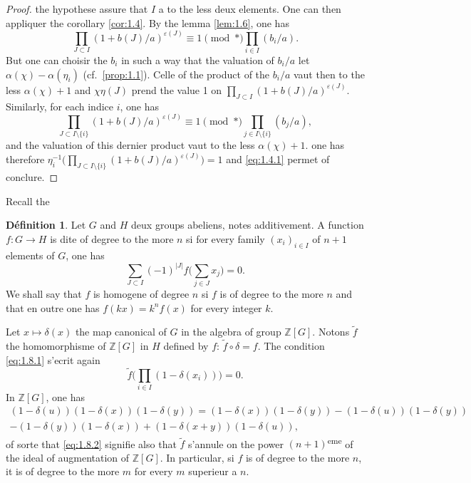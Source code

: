 \documentclass[12pt,a4paper]{article}
\theoremstyle{plain}
\theoremstyle{definition}
\newtheorem{definition}[theorem]{D\'efinition}
\theoremstyle{remark}
\newcommand{\bZ}{\mathbb{Z}}
\begin{document}
\begin{proof}
the hypothese assure that $I$ a to the less deux elements. One can then appliquer the corollary \ref{cor:1.4}. By the lemma \ref{lem:1.6}, one has
\[
\prod_{J \subset I} (1+b(J)/a)^{\varepsilon(J)} \equiv 1 \pmod{*} \prod_{i \in I} (b_i/a).
\]
But one can choisir the $b_i$ in such a way that the valuation of $b_i/a$ let $\alpha(\chi) - \alpha(\eta_i)$ (cf.~\ref{prop:1.1}). Celle of the product of the $b_i/a$ vaut then to the less $\alpha(\chi)+1$ and $\chi\eta(J)$ prend the value 1 on $\prod_{J \subset I}(1+b(J)/a)^{\varepsilon(J)}$. Similarly, for each indice $i$, one has
\[
\prod_{J \subset I \setminus \{i\}} (1+b(J)/a)^{\varepsilon(J)} \equiv 1 \pmod{*} \prod_{j \in I \setminus \{i\}} (b_j/a),
\]
and the valuation of this dernier product vaut to the less $\alpha(\chi) + 1$. one has therefore $\eta_i^{-1}\bigl(\prod_{J \subset I \setminus \{i\}}(1+b(J)/a)^{\varepsilon(J)}\bigr) = 1$ and \eqref{eq:1.4.1} permet of conclure.
\end{proof}

Recall the

\begin{definition}\label{def:1.8}
Let $G$ and $H$ deux groups abeliens, notes additivement. A function $f: G \to H$ is dite of degree to the more $n$ si for every family $(x_i)_{i \in I}$ of $n+1$ elements of $G$, one has
\begin{equation}\label{eq:1.8.1}
\sum_{J \subset I} (-1)^{|J|} f\biggl(\sum_{j \in J} x_j\biggr) = 0.
\end{equation}
We shall say that $f$ is homogene of degree $n$ si $f$ is of degree to the more $n$ and that en outre one has $f(kx) = k^n f(x)$ for every integer $k$.
\end{definition}

Let $x \mapsto \delta(x)$ the map canonical of $G$ in the algebra of group $\bZ[G]$. Notons $\tilde{f}$ the homomorphisme of $\bZ[G]$ in $H$ defined by $f$: $\tilde{f} \circ \delta = f$. The condition \eqref{eq:1.8.1} s'ecrit again
\begin{equation}\label{eq:1.8.2}
\tilde{f}\biggl(\prod_{i \in I}(1-\delta(x_i))\biggr) = 0.
\end{equation}
In $\bZ[G]$, one has
\begin{multline*}
(1-\delta(u))(1-\delta(x))(1-\delta(y)) = (1-\delta(x))(1-\delta(y)) - (1-\delta(u))(1-\delta(y)) \\
- (1-\delta(y))(1-\delta(x)) + (1-\delta(x+y))(1-\delta(u)),
\end{multline*}
of sorte that \eqref{eq:1.8.2} signifie also that $\tilde{f}$ s'annule on the power $(n+1)$\textsuperscript{eme} of the ideal of augmentation of $\bZ[G]$. In particular, si $f$ is of degree to the more $n$, it is of degree to the more $m$ for every $m$ superieur a $n$.
\end{document}
